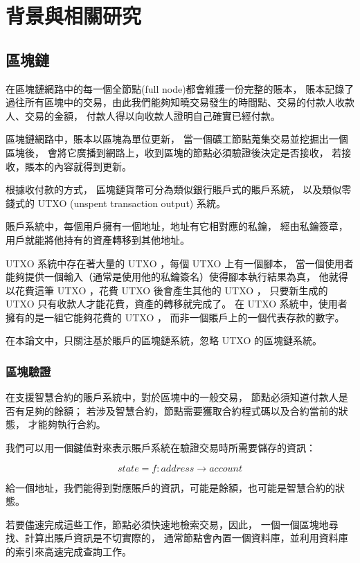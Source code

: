 \graphicspath{ {./images/} }
\chapter{背景與相關研究}
\label{c:background}


\section{區塊鏈}

在區塊鏈網路中的每一個全節點(full node)都會維護一份完整的賬本，
賬本記錄了過往所有區塊中的交易，由此我們能夠知曉交易發生的時間點、交易的付款人收款人、交易的金額，
付款人得以向收款人證明自己確實已經付款。

區塊鏈網路中，賬本以區塊為單位更新，
當一個礦工節點蒐集交易並挖掘出一個區塊後，
會將它廣播到網路上，收到區塊的節點必須驗證後決定是否接收，
若接收，賬本的內容就得到更新。

根據收付款的方式， 區塊鏈貨幣可分為類似銀行賬戶式的賬戶系統，
以及類似零錢式的 UTXO (unspent transaction output) 系統。

賬戶系統中，每個用戶擁有一個地址，地址有它相對應的私鑰，
經由私鑰簽章，用戶就能將他持有的資產轉移到其他地址。

UTXO 系統中存在著大量的 UTXO ，每個 UTXO 上有一個腳本，
當一個使用者能夠提供一個輸入（通常是使用他的私鑰簽名）使得腳本執行結果為真，
他就得以花費這筆 UTXO ，花費 UTXO 後會產生其他的 UTXO ，
只要新生成的 UTXO 只有收款人才能花費，資產的轉移就完成了。
在 UTXO 系統中，使用者擁有的是一組它能夠花費的 UTXO ，
而非一個賬戶上的一個代表存款的數字。

在本論文中，只關注基於賬戶的區塊鏈系統，忽略 UTXO 的區塊鏈系統。

\subsection{區塊驗證}

在支援智慧合約的賬戶系統中，對於區塊中的一般交易，
節點必須知道付款人是否有足夠的餘額；
若涉及智慧合約，節點需要獲取合約程式碼以及合約當前的狀態，
才能夠執行合約。

我們可以用一個鍵值對來表示賬戶系統在驗證交易時所需要儲存的資訊：

\[state = f: address\to account \]

給一個地址，我們能得到對應賬戶的資訊，可能是餘額，也可能是智慧合約的狀態。

若要儘速完成這些工作，節點必須快速地檢索交易，因此，
一個一個區塊地尋找、計算出賬戶資訊是不切實際的， 
通常節點會內置一個資料庫，並利用資料庫的索引來高速完成查詢工作。

